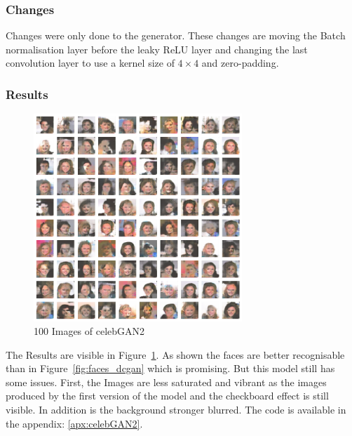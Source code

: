 \subsubsection{Changes}
Changes were only done to the generator. These changes are moving the Batch normalisation layer before the leaky ReLU layer and changing the last convolution layer to use a kernel size of $4\times4$ and zero-padding. 
\subsubsection{Results}
\begin{figure}[H]
    \centering
    \includegraphics[width=0.7\textwidth]{images/faces2.png}
    \caption{100 Images of celebGAN2}
    \label{fig:pred_celebGAN2}
\end{figure}
The Results are visible in Figure~\ref{fig:pred_celebGAN2}. As shown the faces are better recognisable than in Figure~\ref{fig:faces_dcgan} which is promising. But this model still has some issues. First, the Images are less saturated and vibrant as the images produced by the first version of the model and the checkboard effect is still visible. In addition is the background stronger blurred. The code is available in the appendix: \ref{apx:celebGAN2}.
